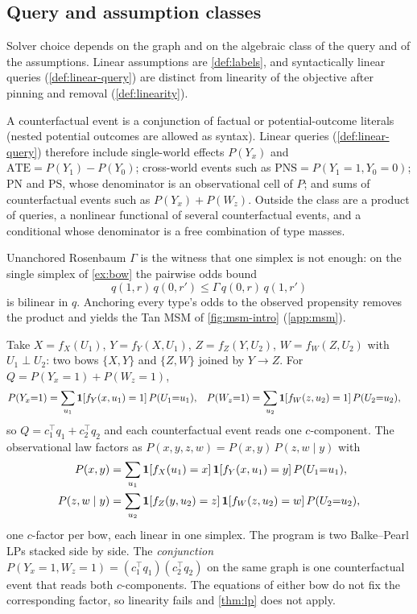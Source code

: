 \subsection{Query and assumption classes}
\label{sec:labels}

Solver choice depends on the graph and on the algebraic class of the query
and of the assumptions. Linear assumptions are \cref{def:labels}, and
syntactically linear queries (\cref{def:linear-query}) are distinct from
linearity of the objective after pinning and removal (\cref{def:linearity}).

A counterfactual event is a conjunction of factual or potential-outcome literals
(nested potential outcomes are allowed as syntax). Linear queries (\cref{def:linear-query})
therefore include single-world effects $P(Y_x)$ and
$\mathrm{ATE}=P(Y_1)-P(Y_0)$; cross-world events such as
$\mathrm{PNS}=P(Y_1{=}1,Y_0{=}0)$; PN and PS, whose denominator is an
observational cell of $P$; and sums of counterfactual events such as $P(Y_x)+P(W_z)$.
Outside the class are a product of queries, a nonlinear functional of
several counterfactual events, and a conditional whose denominator is a free combination
of type masses.

\begin{example}
\label{ex:gamma}
Unanchored Rosenbaum $\Gamma$ is the witness that one simplex is not enough:
on the single simplex of \cref{ex:bow} the pairwise odds bound
\begin{equation}
\label{eq:gamma}
q(1,r)\,q(0,r')
\le
\Gamma\,q(0,r)\,q(1,r')
\end{equation}
is bilinear in $q$. Anchoring every type's odds to the observed propensity
removes the product and yields the Tan MSM of \cref{fig:msm-intro}
(\cref{app:msm}).
\end{example}


\begin{example}
\label{ex:two-bows}
Take $X=f_X(U_1)$, $Y=f_Y(X,U_1)$, $Z=f_Z(Y,U_2)$, $W=f_W(Z,U_2)$ with
$U_1\perp U_2$: two bows $\{X,Y\}$ and $\{Z,W\}$ joined by $Y\to Z$.
For $Q=P(Y_x{=}1)+P(W_z{=}1)$,
\begin{align*}
P(Y_x{=}1)
&=
\sum_{u_1}\mathbf{1}[f_Y(x,u_1)=1]\,P(U_1{=}u_1),
&
P(W_z{=}1)
&=
\sum_{u_2}\mathbf{1}[f_W(z,u_2)=1]\,P(U_2{=}u_2),
\end{align*}
so $Q=c_1^\top q_1+c_2^\top q_2$ and each counterfactual event reads one $c$-component. The
observational law factors as $P(x,y,z,w)=P(x,y)\,P(z,w\mid y)$ with
\begin{align*}
P(x,y)&=\sum_{u_1}\mathbf{1}[f_X(u_1)=x]\,\mathbf{1}[f_Y(x,u_1)=y]\,P(U_1{=}u_1),\\
P(z,w\mid y)&=\sum_{u_2}\mathbf{1}[f_Z(y,u_2)=z]\,\mathbf{1}[f_W(z,u_2)=w]\,P(U_2{=}u_2),
\end{align*}
one $c$-factor per bow, each linear in one simplex. The program is two
Balke--Pearl LPs stacked side by side.
The \emph{conjunction} $P(Y_x{=}1,W_z{=}1)=(c_1^\top q_1)(c_2^\top q_2)$
on the same graph is one counterfactual event that reads both $c$-components.
The equations of either bow do not fix the corresponding factor, so linearity
fails and \cref{thm:lp} does not apply.
\end{example}

